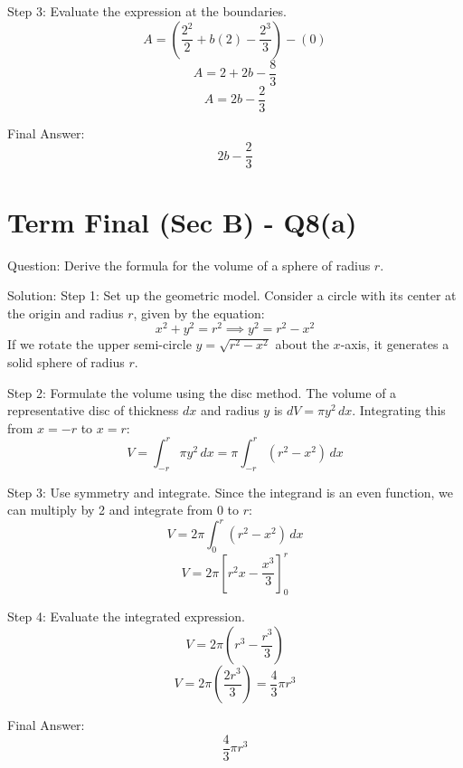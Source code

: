 \documentclass{article}
\begin{document}
Step 3: Evaluate the expression at the boundaries.
\[
A = \left( \frac{2^2}{2} + b(2) - \frac{2^3}{3} \right) - (0)
\]
\[
A = 2 + 2b - \frac{8}{3}
\]
\[
A = 2b - \frac{2}{3}
\]

Final Answer:
\[
\boxed{2b - \frac{2}{3}}
\]

\section*{Term Final (Sec B) - Q8(a)}
Question:
Derive the formula for the volume of a sphere of radius \(r\).

Solution:
Step 1: Set up the geometric model.
Consider a circle with its center at the origin and radius \(r\), given by the equation:
\[
x^2 + y^2 = r^2 \implies y^2 = r^2 - x^2
\]
If we rotate the upper semi-circle \(y = \sqrt{r^2 - x^2}\) about the \(x\)-axis, it generates a solid sphere of radius \(r\).

Step 2: Formulate the volume using the disc method.
The volume of a representative disc of thickness \(dx\) and radius \(y\) is \(dV = \pi y^2 \, dx\).
Integrating this from \(x = -r\) to \(x = r\):
\[
V = \int_{-r}^{r} \pi y^2 \, dx = \pi \int_{-r}^{r} (r^2 - x^2) \, dx
\]

Step 3: Use symmetry and integrate.
Since the integrand is an even function, we can multiply by 2 and integrate from \(0\) to \(r\):
\[
V = 2\pi \int_0^r (r^2 - x^2) \, dx
\]
\[
V = 2\pi \left[ r^2 x - \frac{x^3}{3} \right]_0^r
\]

Step 4: Evaluate the integrated expression.
\[
V = 2\pi \left( r^3 - \frac{r^3}{3} \right)
\]
\[
V = 2\pi \left( \frac{2r^3}{3} \right) = \frac{4}{3}\pi r^3
\]

Final Answer:
\[
\boxed{\frac{4}{3}\pi r^3}
\]

\end{document}
